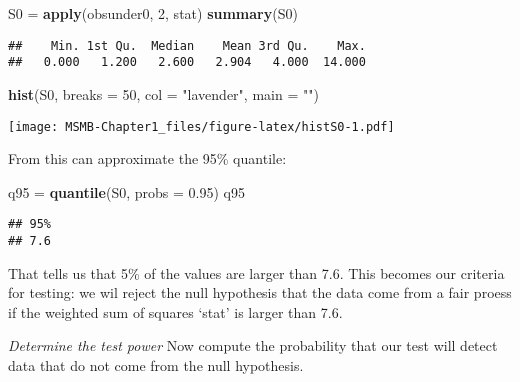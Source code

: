 \documentclass[]{article}
\newenvironment{Shaded}{\begin{snugshade}}{\end{snugshade}}
\newcommand{\KeywordTok}[1]{\textcolor[rgb]{0.13,0.29,0.53}{\textbf{#1}}}
\newcommand{\DataTypeTok}[1]{\textcolor[rgb]{0.13,0.29,0.53}{#1}}
\newcommand{\DecValTok}[1]{\textcolor[rgb]{0.00,0.00,0.81}{#1}}
\newcommand{\FloatTok}[1]{\textcolor[rgb]{0.00,0.00,0.81}{#1}}
\newcommand{\StringTok}[1]{\textcolor[rgb]{0.31,0.60,0.02}{#1}}
\newcommand{\NormalTok}[1]{#1}
\let\origfigure\figure
\let\endorigfigure\endfigure
\renewenvironment{figure}[1][2] {
    \expandafter\origfigure\expandafter[H]
} {
    \endorigfigure
}
\begin{document}
\begin{Shaded}
\begin{Highlighting}[]
\NormalTok{S0 =}\StringTok{ }\KeywordTok{apply}\NormalTok{(obsunder0, }\DecValTok{2}\NormalTok{, stat)}
\KeywordTok{summary}\NormalTok{(S0)}
\end{Highlighting}
\end{Shaded}

\begin{verbatim}
##    Min. 1st Qu.  Median    Mean 3rd Qu.    Max. 
##   0.000   1.200   2.600   2.904   4.000  14.000
\end{verbatim}

\begin{Shaded}
\begin{Highlighting}[]
\KeywordTok{hist}\NormalTok{(S0, }\DataTypeTok{breaks =} \DecValTok{50}\NormalTok{, }\DataTypeTok{col =} \StringTok{"lavender"}\NormalTok{, }\DataTypeTok{main =} \StringTok{""}\NormalTok{)}
\end{Highlighting}
\end{Shaded}

\begin{figure}
\centering
\texttt{[image: MSMB-Chapter1\_files/figure-latex/histS0-1.pdf]}
\caption{The histogram of simulated values \texttt{S0} of the statistic
\texttt{stat} under the null (fair) distribution provides an
approximation of the \textbf{sampling distribution} of the statistic
\texttt{stat}.}
\end{figure}

From this can approximate the 95\% quantile:

\begin{Shaded}
\begin{Highlighting}[]
\NormalTok{q95 =}\StringTok{ }\KeywordTok{quantile}\NormalTok{(S0, }\DataTypeTok{probs =} \FloatTok{0.95}\NormalTok{)}
\NormalTok{q95}
\end{Highlighting}
\end{Shaded}

\begin{verbatim}
## 95% 
## 7.6
\end{verbatim}

That tells us that 5\% of the values are larger than 7.6. This becomes
our criteria for testing: we wil reject the null hypothesis that the
data come from a fair proess if the weighted sum of squares `stat' is
larger than 7.6.

\emph{Determine the test power} Now compute the probability that our
test will detect data that do not come from the null hypothesis.
\end{document}
